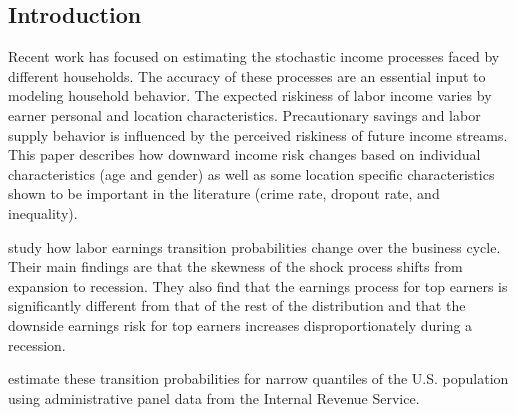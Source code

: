 \documentclass[letterpaper,12pt]{article}
\theoremstyle{definition}
\begin{document}
\begin{spacing}{1.5}

\section{Introduction}\label{SecIntro}

  Recent work has focused on estimating the stochastic income processes faced by different households. The accuracy of these processes are an essential input to modeling household behavior. The expected riskiness of labor income varies by earner personal and location characteristics. Precautionary savings and labor supply behavior is influenced by the perceived riskiness of future income streams. This paper describes how downward income risk changes based on individual characteristics (age and gender) as well as some location specific characteristics shown to be important in the literature (crime rate, dropout rate, and inequality).

  \citet{GuvenenEtAl:2014} study how labor earnings transition probabilities change over the business cycle. Their main findings are that the skewness of the shock process shifts from expansion to recession. They also find that the earnings process for top earners is significantly different from that of the rest of the distribution and that the downside earnings risk for top earners increases disproportionately during a recession.

  \citet{DeBackerRamnath:2019} estimate these transition probabilities for narrow quantiles of the U.S. population using administrative panel data from the Internal Revenue Service.




\end{spacing}
\end{document}
